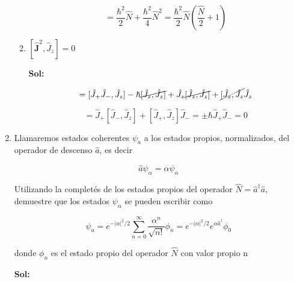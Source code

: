 \documentclass[12pt,a4paper]{article}
\begin{document}
\begin{enumerate}
\begin{enumerate}
    \begin{equation*}
        = \frac{\hbar^2}{2}\hat{N} + \frac{\hbar^2}{4}\hat{N}^2 = \frac{\hbar^2}{2}\hat{N}\left(\frac{\hat{N}}{2} + 1\right)
    \end{equation*}
    
    
    
    
    \item $[\mathbf{\hat{J}}^2 , \hat{J}_{z}] = 0$
    
    \textbf{Sol:}
    
    \begin{equation*}
        [\mathbf{\hat{J}}^2 , \hat{J}_{z}] = [\hat{J}_{+}\hat{J}_{-}, \hat{J}_{z}] - \hbar \cancel{[\hat{J}_{z}, \hat{J}_{z}]} + \hat{J}_{z}\cancel{[\hat{J}_{z}, \hat{J_{z}}]} + \cancel{[\hat{J}_{z}, \hat{J}_{z}} \hat{J}_{z} 
    \end{equation*}
    
    \begin{equation*}
        = \hat{J}_{+}[\hat{J}_{-}, \hat{J}_{z}] + [\hat{J}_{+}, \hat{J}_{z}] \hat{J}_{-} = \pm \hbar \hat{J}_{+} \hat{J}_{-} = 0
    \end{equation*}
    
    
    
\end{enumerate}






\item Llamaremos estados coherentes $\psi_{a}$ a los estados propios, normalizados, del operador de descenso $\hat{a}$, es decir

\begin{equation*}
    \hat{a} \psi_{\alpha} = \alpha \psi_{\alpha}
\end{equation*}

Utilizando la completés de los estados propios del operador $\hat{N} = \hat{a}^{\dagger}\hat{a}$, demuestre que los estados $\psi_{\alpha}$ se pueden escribir como

\begin{equation*}
    \psi_a = e^{-|\alpha|^{2}/2} \sum_{n=0}^{\infty} \frac{\alpha^n}{\sqrt{n!}}\phi_{n} = e^{-|\alpha|^{2}/2} e^{\alpha \hat{a}^{\dagger}} \phi_0
\end{equation*}

donde $\phi_n$ es el estado propio del operador $\hat{N}$ con valor propio n

\textbf{Sol:}


\end{enumerate}
\end{document}
